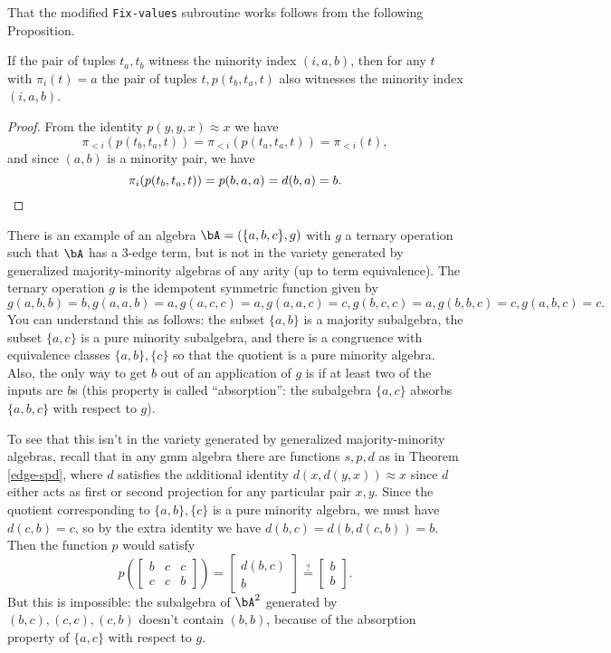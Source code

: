 That the modified \texttt{Fix-values} subroutine works follows from the following Proposition.

\begin{prop} If the pair of tuples $t_a,t_b$ witness the minority index $(i,a,b)$, then for any $t$ with $\pi_i(t) = a$ the pair of tuples $t,p(t_b,t_a,t)$ also witnesses the minority index $(i,a,b)$.
\end{prop}
\begin{proof} From the identity $p(y,y,x) \approx x$ we have
\[
\pi_{<i}(p(t_b,t_a,t)) = \pi_{<i}(p(t_a,t_a,t)) = \pi_{<i}(t),
\]
and since $(a,b)$ is a minority pair, we have
\[
\pi_i(p(t_b,t_a,t)) = p(b,a,a) = d(b,a) = b.\qedhere
\]
\end{proof}

\begin{ex}\label{ex-few-subpowers} There is an example of an algebra $\bA = (\{a,b,c\}, g)$ with $g$ a ternary operation such that $\bA$ has a $3$-edge term, but is not in the variety generated by generalized majority-minority algebras of any arity (up to term equivalence). The ternary operation $g$ is the idempotent symmetric function given by
\[
g(a,b,b) = b, g(a,a,b) = a, g(a,c,c) = a, g(a,a,c) = c, g(b,c,c) = a, g(b,b,c) = c, g(a,b,c) = c.
\]
You can understand this as follows: the subset $\{a,b\}$ is a majority subalgebra, the subset $\{a,c\}$ is a pure minority subalgebra, and there is a congruence with equivalence classes $\{a,b\}, \{c\}$ so that the quotient is a pure minority algebra. Also, the only way to get $b$ out of an application of $g$ is if at least two of the inputs are $b$s (this property is called ``absorption'': the subalgebra $\{a,c\}$ absorbs $\{a,b,c\}$ with respect to $g$).

To see that this isn't in the variety generated by generalized majority-minority algebras, recall that in any gmm algebra there are functions $s,p,d$ as in Theorem \ref{edge-spd}, where $d$ satisfies the additional identity $d(x,d(y,x)) \approx x$ since $d$ either acts as first or second projection for any particular pair $x,y$. Since the quotient corresponding to $\{a,b\}, \{c\}$ is a pure minority algebra, we must have $d(c,b) = c$, so by the extra identity we have $d(b,c) = d(b,d(c,b)) = b$. Then the function $p$ would satisfy
\[
p\left(\begin{bmatrix} b & c & c\\ c & c & b\end{bmatrix}\right) = \begin{bmatrix} d(b,c)\\ b\end{bmatrix} \stackrel{?}{=} \begin{bmatrix} b\\ b\end{bmatrix}.
\]
But this is impossible: the subalgebra of $\bA^2$ generated by $(b,c), (c,c), (c,b)$ doesn't contain $(b,b)$, because of the absorption property of $\{a,c\}$ with respect to $g$.


\end{ex}
